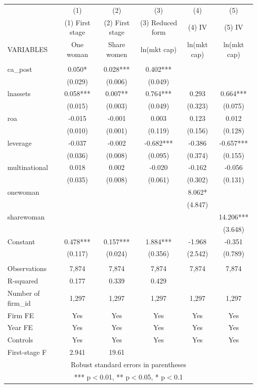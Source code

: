 \begin{tabular}{lccccc} \hline
 & (1) & (2) & (3) & (4) & (5) \\
 & (1) First stage & (2) First stage & (3) Reduced form & (4) IV & (5) IV \\
VARIABLES & One woman & Share women & ln(mkt cap) & ln(mkt cap) & ln(mkt cap) \\ \hline
 &  &  &  &  &  \\
ca\_post & 0.050* & 0.028*** & 0.402*** &  &  \\
 & (0.029) & (0.006) & (0.049) &  &  \\
lnassets & 0.058*** & 0.007** & 0.764*** & 0.293 & 0.664*** \\
 & (0.015) & (0.003) & (0.049) & (0.323) & (0.075) \\
roa & -0.015 & -0.001 & 0.003 & 0.123 & 0.012 \\
 & (0.010) & (0.001) & (0.119) & (0.156) & (0.128) \\
leverage & -0.037 & -0.002 & -0.682*** & -0.386 & -0.657*** \\
 & (0.036) & (0.008) & (0.095) & (0.374) & (0.155) \\
multinational & 0.018 & 0.002 & -0.020 & -0.162 & -0.056 \\
 & (0.035) & (0.008) & (0.061) & (0.302) & (0.131) \\
onewoman &  &  &  & 8.062* &  \\
 &  &  &  & (4.847) &  \\
sharewoman &  &  &  &  & 14.206*** \\
 &  &  &  &  & (3.648) \\
Constant & 0.478*** & 0.157*** & 1.884*** & -1.968 & -0.351 \\
 & (0.117) & (0.024) & (0.356) & (2.542) & (0.789) \\
 &  &  &  &  &  \\
Observations & 7,874 & 7,874 & 7,874 & 7,874 & 7,874 \\
R-squared & 0.177 & 0.339 & 0.429 &  &  \\
Number of firm\_id & 1,297 & 1,297 & 1,297 & 1,297 & 1,297 \\
Firm FE & Yes & Yes & Yes & Yes & Yes \\
Year FE & Yes & Yes & Yes & Yes & Yes \\
Controls & Yes & Yes & Yes & Yes & Yes \\
 First-stage F & 2.941 & 19.61 &  &  &  \\ \hline
\multicolumn{6}{c}{ Robust standard errors in parentheses} \\
\multicolumn{6}{c}{ *** p$<$0.01, ** p$<$0.05, * p$<$0.1} \\
\end{tabular}
